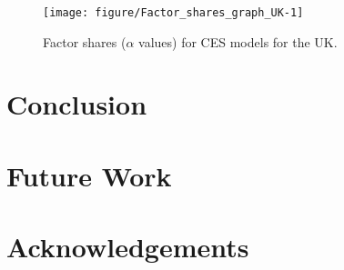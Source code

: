 \documentclass[preprint,authoryear,12pt]{elsarticle}\usepackage[]{graphicx}\usepackage[]{color}
\makeatletter
\def\maxwidth{ %
  \ifdim\Gin@nat@width>\linewidth
    \linewidth
  \else
    \Gin@nat@width
  \fi
}
\newenvironment{knitrout}{}{} %
\makeatother
\begin{document}
\begin{knitrout}
\color{fgcolor}\begin{figure}[H]

{\centering \texttt{[image: figure/Factor\_shares\_graph\_UK-1]} 

}

\caption[Factor shares (]{Factor shares ($\alpha$ values) for CES models for the UK.}\label{fig:Factor_shares_graph_UK}
\end{figure}


\end{knitrout}





























\section{Conclusion}
\label{sec:Conclusion}


\section{Future Work}
\label{sec:FutureWork}




\section*{Acknowledgements}
\label{sec:Acknowledgements}




\end{document}
